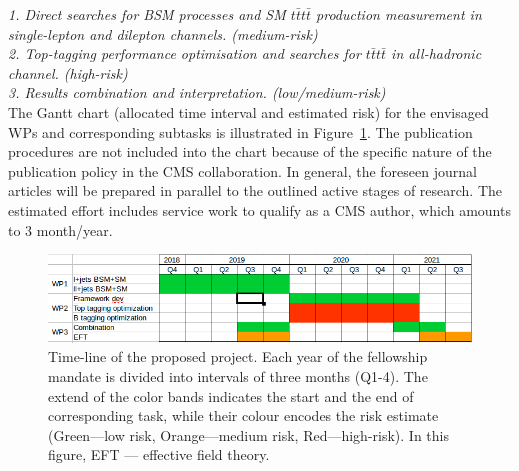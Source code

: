%
%
%

\noindent\textit{1. Direct searches for BSM processes and SM $t\bar{t}t\bar{t}$ production measurement in single-lepton and dilepton channels. (medium-risk)}\\



\noindent\textit{2. Top-tagging performance optimisation and searches for $t\bar{t}t\bar{t}$ in all-hadronic channel. (high-risk)}\\



\noindent\textit{3. Results combination and interpretation. (low/medium-risk)}\\


The Gantt chart (allocated time interval and estimated risk) for the envisaged WPs and corresponding subtasks is illustrated in Figure~\ref{fig:gantt_new}. The publication procedures are not included into the chart because of the specific nature of the publication policy in the CMS collaboration. In general, the foreseen journal articles will be prepared in parallel to the outlined active stages of research. The estimated effort includes service work to qualify as a CMS author, which amounts to 3 month/year.
%
\begin{figure}[h!]
\centering
\includegraphics[width=\linewidth]{figures/gantt_new}
        \caption{Time-line of the proposed project. Each year of the fellowship mandate is divided into intervals of three months (Q1-4). The extend of the color bands indicates the start and the end of corresponding task, while their colour encodes the risk estimate (Green---low risk, Orange---medium risk, Red---high-risk). In this figure, EFT --- effective field theory.}
\label{fig:gantt_new}
\end{figure}
